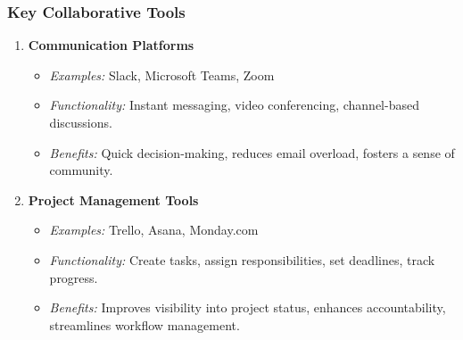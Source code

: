 \documentclass[aspectratio=169]{beamer}
\begin{document}
\begin{frame}[fragile]
    \frametitle{Key Collaborative Tools}
    \begin{enumerate}
        \item \textbf{Communication Platforms}
            \begin{itemize}
                \item \textit{Examples:} Slack, Microsoft Teams, Zoom
                \item \textit{Functionality:} Instant messaging, video conferencing, channel-based discussions.
                \item \textit{Benefits:} Quick decision-making, reduces email overload, fosters a sense of community.
            \end{itemize}

        \item \textbf{Project Management Tools}
            \begin{itemize}
                \item \textit{Examples:} Trello, Asana, Monday.com
                \item \textit{Functionality:} Create tasks, assign responsibilities, set deadlines, track progress.
                \item \textit{Benefits:} Improves visibility into project status, enhances accountability, streamlines workflow management.
            \end{itemize}
    \end{enumerate}
\end{frame}
\end{document}
